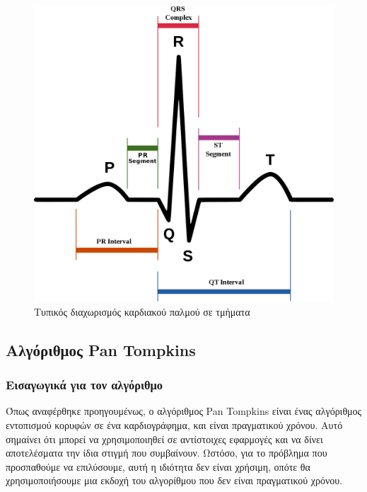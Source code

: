 \begin{figure}[h]
    \centering
    \includegraphics[scale=0.15]{latex_code/Figures_new/qrs.png}
    \caption{Τυπικός διαχωρισμός καρδιακού παλμού σε τμήματα}
    \label{fig:qrs}
\end{figure}

\subsection*{Αλγόριθμος Pan Tompkins}


\subsubsection*{Εισαγωγικά για τον αλγόριθμο}

Όπως αναφέρθηκε προηγουμένως, ο αλγόριθμος Pan Tompkins είναι ένας αλγόριθμος εντοπισμού κορυφών σε ένα καρδιογράφημα, και είναι πραγματικού χρόνου. Αυτό σημαίνει ότι μπορεί να χρησιμοποιηθεί σε αντίστοιχες εφαρμογές και να δίνει αποτελέσματα την ίδια στιγμή που συμβαίνουν. Ωστόσο, για το πρόβλημα που προσπαθούμε να επιλύσουμε, αυτή η ιδιότητα δεν είναι χρήσιμη, οπότε θα χρησιμοποιήσουμε μια εκδοχή του αλγορίθμου που δεν είναι πραγματικού χρόνου.

